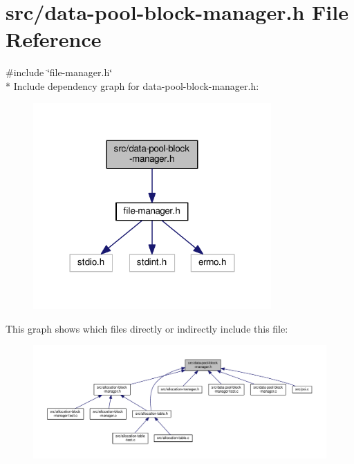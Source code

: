 \hypertarget{data-pool-block-manager_8h}{\section{src/data-\/pool-\/block-\/manager.h File Reference}
\label{data-pool-block-manager_8h}
}
{\ttfamily \#include \char`\"{}file-\/manager.\-h\char`\"{}}\\*
Include dependency graph for data-\/pool-\/block-\/manager.h\-:
\nopagebreak
\begin{figure}[H]
\begin{center}
\leavevmode
\includegraphics[width=258pt]{data-pool-block-manager_8h__incl}
\end{center}
\end{figure}
This graph shows which files directly or indirectly include this file\-:
\nopagebreak
\begin{figure}[H]
\begin{center}
\leavevmode
\includegraphics[width=350pt]{data-pool-block-manager_8h__dep__incl}
\end{center}
\end{figure}
